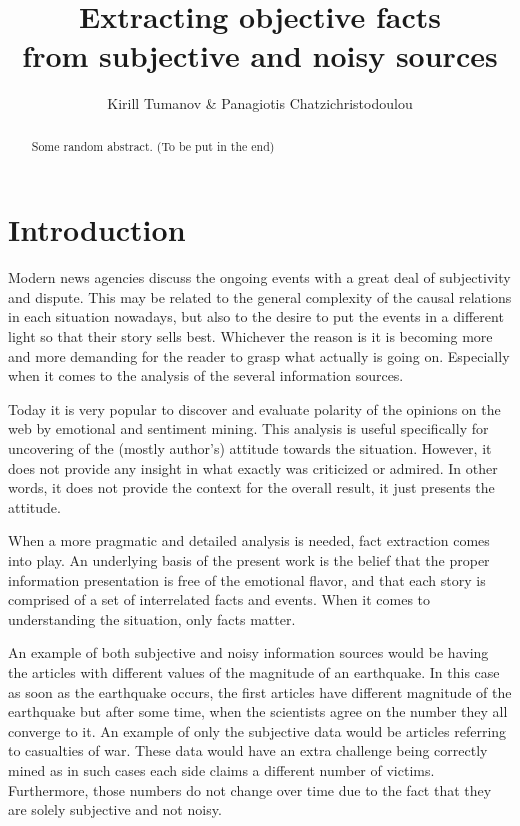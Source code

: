 \documentclass[]{article}
\title{Extracting objective facts \\ from subjective and noisy sources}
\author{Kirill Tumanov \& Panagiotis Chatzichristodoulou}
\begin{document}
\maketitle

\begin{abstract}
Some random abstract. (To be put in the end)
\end{abstract}

%
\section{Introduction}
%
Modern news agencies discuss the ongoing events with a great deal of subjectivity and dispute. This may be related to the general complexity of the causal relations in each situation nowadays, but also to the desire to put the events in a different light so that their story sells best. Whichever the reason is it is becoming more and more demanding for the reader to grasp what actually is going on. Especially when it comes to the analysis of the several information sources.

Today it is very popular to discover and evaluate polarity of the opinions on the web by emotional and sentiment mining. This analysis is useful specifically for uncovering of the (mostly author's) attitude towards the situation. However, it does not provide any insight in what exactly was criticized or admired. In other words, it does not provide the context for the overall result, it just presents the attitude.

When a more pragmatic and detailed analysis is needed, fact extraction comes into play. An underlying basis of the present work is the belief that the proper information presentation is free of the emotional flavor, and that each story is comprised of a set of interrelated facts and events. When it comes to understanding the situation, only facts matter.

An example of both subjective and noisy information sources would be having the articles with different values of the magnitude of an earthquake. In this case as soon as the earthquake occurs, the first articles have different magnitude of the earthquake but after some time, when the scientists agree on the number they all converge to it. An example of only the subjective data would be articles referring to casualties of war. These data would have an extra challenge being correctly mined as in such cases each side claims a different number of victims. Furthermore, those numbers do not change over time due to the fact that they are solely subjective and not noisy.
\end{document}
